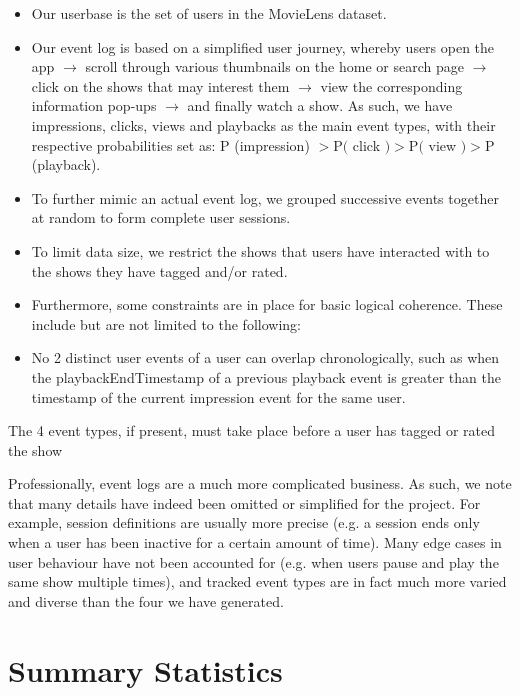 \documentclass[10pt,titlepage]{article}
\begin{document}
\begin{itemize}
  \item Our userbase is the set of users in the MovieLens dataset.

  \item Our event log is based on a simplified user journey, whereby users open the app $\rightarrow$ scroll through various thumbnails on the home or search page $\rightarrow$ click on the shows that may interest them $\rightarrow$ view the corresponding information pop-ups $\rightarrow$ and finally watch a show. As such, we have impressions, clicks, views and playbacks as the main event types, with their respective probabilities set as: $\mathrm{P}$ (impression) $>\mathrm{P}($ click $)>\mathrm{P}($ view $)>\mathrm{P}$ (playback).

  \item To further mimic an actual event log, we grouped successive events together at random to form complete user sessions.

  \item To limit data size, we restrict the shows that users have interacted with to the shows they have tagged and/or rated.

  \item Furthermore, some constraints are in place for basic logical coherence. These include but are not limited to the following:

  \item No 2 distinct user events of a user can overlap chronologically, such as when the playbackEndTimestamp of a previous playback event is greater than the timestamp of the current impression event for the same user.

\end{itemize}

 The 4 event types, if present, must take place before a user has tagged or rated the show

Professionally, event logs are a much more complicated business. As such, we note that many details have indeed been omitted or simplified for the project. For example, session definitions are usually more precise (e.g. a session ends only when a user has been inactive for a certain amount of time). Many edge cases in user behaviour have not been accounted for (e.g. when users pause and play the same show multiple times), and tracked event types are in fact much more varied and diverse than the four we have generated.

\section{Summary Statistics}
\end{document}
